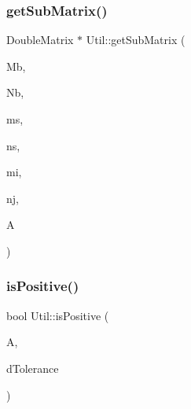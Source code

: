 \subsubsection{\texorpdfstring{get\+Sub\+Matrix()}{getSubMatrix()}}
{\footnotesize\ttfamily Double\+Matrix $\ast$ Util\+::get\+Sub\+Matrix (\begin{DoxyParamCaption}\item[{\hyperlink{lp__lib_8h_adeb9ec6400320e4923ac9d836d509ddb}{int}}]{Mb,  }\item[{\hyperlink{lp__lib_8h_adeb9ec6400320e4923ac9d836d509ddb}{int}}]{Nb,  }\item[{\hyperlink{lp__lib_8h_adeb9ec6400320e4923ac9d836d509ddb}{int}}]{ms,  }\item[{\hyperlink{lp__lib_8h_adeb9ec6400320e4923ac9d836d509ddb}{int}}]{ns,  }\item[{\hyperlink{lp__lib_8h_adeb9ec6400320e4923ac9d836d509ddb}{int}}]{mi,  }\item[{\hyperlink{lp__lib_8h_adeb9ec6400320e4923ac9d836d509ddb}{int}}]{nj,  }\item[{Double\+Matrix \&}]{A }\end{DoxyParamCaption})\hspace{0.3cm}{\ttfamily [static]}}

\mbox{\label{class_l_i_b___l_a_1_1_util_a2104ea0df84df1aad921d4dfad1249ac}} 
\subsubsection{\texorpdfstring{is\+Positive()}{isPositive()}}
{\footnotesize\ttfamily bool Util\+::is\+Positive (\begin{DoxyParamCaption}\item[{Double\+Matrix \&}]{A,  }\item[{double}]{d\+Tolerance }\end{DoxyParamCaption})\hspace{0.3cm}{\ttfamily [static]}}

\mbox{\label{class_l_i_b___l_a_1_1_util_abc9f3aa8448b800e16b9876860f05d5d}} 
